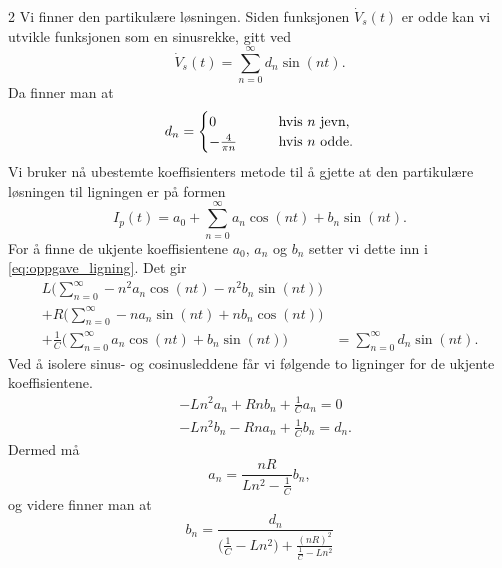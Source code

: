 \documentclass{article}
\theoremstyle{definition}
\newenvironment{customoppg}[1]
{\renewcommand\theinnercustomoppg{#1}\innercustomoppg}
{\endinnercustomoppg}
\theoremstyle{remark}
\begin{document}
\begin{multicols*}{2}
\begin{customoppg}{11}
Vi finner den partikulære løsningen. Siden funksjonen $\dot{V}_s(t)$ er odde kan vi utvikle funksjonen som en sinusrekke, gitt ved
\begin{equation*}
    \dot{V}_s(t) = \sum_{n = 0}^{\infty} d_n \sin(nt).
\end{equation*}
Da finner man at
\begin{equation*}
    d_n =
    \begin{cases}
        0 & \qquad \textnormal{hvis } n \textnormal{ jevn}, \\
        -\frac{4}{\pi n} & \qquad \textnormal{hvis } n \textnormal{ odde}.
    \end{cases}
\end{equation*}
Vi bruker nå ubestemte koeffisienters metode til å gjette at den partikulære løsningen til ligningen er på formen
\begin{equation*}
    I_p(t) = a_0 + \sum_{n = 0}^{\infty} a_n \cos(n t) + b_n \sin(n t).
\end{equation*}
For å finne de ukjente koeffisientene $a_0$, $a_n$ og $b_n$ setter vi dette inn i \eqref{eq:oppgave_ligning}. Det gir
\begin{equation*}
    \begin{aligned}
        L \bigg( \sum_{n = 0}^{\infty} -n^2 a_n \cos(n t) - n^2 b_n \sin(nt) \bigg)& \\ + R \bigg( \sum_{n = 0}^{\infty} -n a_n \sin(n t) + n b_n \cos(nt) \bigg) & \\ + \frac{1}{C} \bigg( \sum_{n = 0}^{\infty} a_n \cos(n t) + b_n \sin(nt) \bigg) & = \sum_{n = 0}^{\infty} d_n \sin(nt).
    \end{aligned}
\end{equation*}
Ved å isolere sinus- og cosinusleddene får vi følgende to ligninger for de ukjente koeffisientene.
\begin{equation*}
    \begin{aligned}
        & - L n^2 a_n + R n b_n + \frac{1}{C} a_n = 0 \\
        & - L n^2 b_n - R n a_n + \frac{1}{C} b_n = d_n.
    \end{aligned}
\end{equation*}
Dermed må
\begin{equation*}
    a_n = \frac{nR}{Ln^2 - \frac{1}{C}} b_n,
\end{equation*}
og videre finner man at
\begin{equation*}
    b_n = \frac{d_n}{\big(\frac{1}{C} - Ln^2\big) + \frac{(n R)^2}{\frac{1}{C} - Ln^2}}
\end{equation*}

\end{customoppg}
\end{multicols*}
\end{document}
